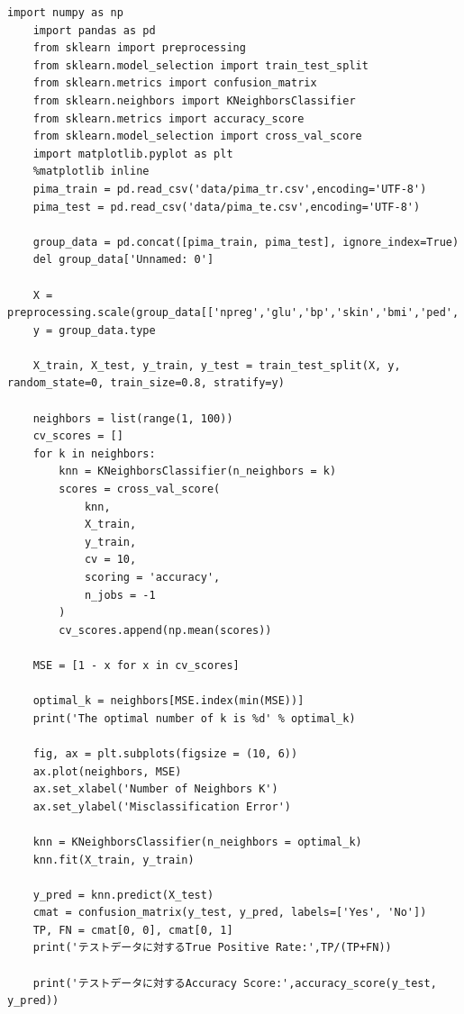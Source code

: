 \documentclass[12pt]{jarticle}
\begin{document}
\begin{lstlisting}[style = py,caption=レポート課題(2)]
    import numpy as np
    import pandas as pd
    from sklearn import preprocessing
    from sklearn.model_selection import train_test_split
    from sklearn.metrics import confusion_matrix
    from sklearn.neighbors import KNeighborsClassifier
    from sklearn.metrics import accuracy_score
    from sklearn.model_selection import cross_val_score
    import matplotlib.pyplot as plt
    %matplotlib inline
    pima_train = pd.read_csv('data/pima_tr.csv',encoding='UTF-8')
    pima_test = pd.read_csv('data/pima_te.csv',encoding='UTF-8')
    
    group_data = pd.concat([pima_train, pima_test], ignore_index=True)
    del group_data['Unnamed: 0']
    
    X = preprocessing.scale(group_data[['npreg','glu','bp','skin','bmi','ped','age']])
    y = group_data.type
    
    X_train, X_test, y_train, y_test = train_test_split(X, y, random_state=0, train_size=0.8, stratify=y)
    
    neighbors = list(range(1, 100))
    cv_scores = []
    for k in neighbors:
        knn = KNeighborsClassifier(n_neighbors = k)
        scores = cross_val_score(
            knn,
            X_train,
            y_train,
            cv = 10,
            scoring = 'accuracy',
            n_jobs = -1
        )
        cv_scores.append(np.mean(scores))
    
    MSE = [1 - x for x in cv_scores]
    
    optimal_k = neighbors[MSE.index(min(MSE))]
    print('The optimal number of k is %d' % optimal_k)
    
    fig, ax = plt.subplots(figsize = (10, 6))
    ax.plot(neighbors, MSE)
    ax.set_xlabel('Number of Neighbors K')
    ax.set_ylabel('Misclassification Error')
    
    knn = KNeighborsClassifier(n_neighbors = optimal_k)
    knn.fit(X_train, y_train)
    
    y_pred = knn.predict(X_test)
    cmat = confusion_matrix(y_test, y_pred, labels=['Yes', 'No'])
    TP, FN = cmat[0, 0], cmat[0, 1]
    print('テストデータに対するTrue Positive Rate:',TP/(TP+FN))
    
    print('テストデータに対するAccuracy Score:',accuracy_score(y_test, y_pred))
\end{lstlisting}


\end{document}
